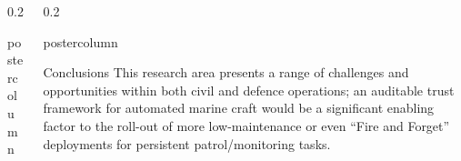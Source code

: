 \documentclass[final,hyperref={pdfpagelabels=false}]{beamer}
\def\colwidth{0.2\linewidth}
\begin{document}
\begin{frame}[fragile]
\begin{columns}[T]
\begin{column}{\colwidth}
\begin{beamercolorbox}[center,wd=\textwidth]{postercolumn}
\begin{minipage}[T]{.98\textwidth}
{					}
				\end{minipage}
			\end{beamercolorbox}
		\end{column}
		\begin{column}{\colwidth}
			\begin{beamercolorbox}[center,wd=\textwidth]{postercolumn}
				\begin{minipage}[T]{.98\textwidth} %
					\parbox[t]{\textwidth}{ %
												
						\begin{block}{Conclusions}
							This research area presents a range of challenges and opportunities within both civil and defence operations; an auditable trust framework for automated marine craft would be a significant enabling factor to the roll-out of more low-maintenance or even ``Fire and Forget'' deployments for persistent patrol/monitoring tasks. 
														
							\vspace{0.25\baselineskip}
														

\end{block}}
\end{minipage}
\end{beamercolorbox}
\end{column}
\end{columns}
\end{frame}
\end{document}
